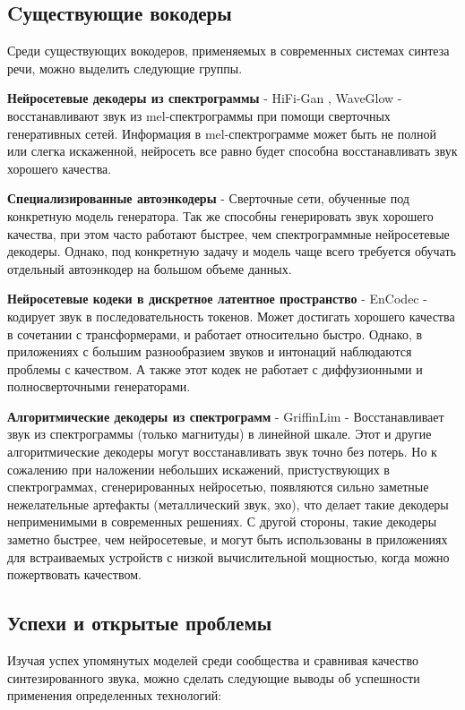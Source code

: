 \subsection{Cуществующие вокодеры}
Среди существующих вокодеров, применяемых в современных системах синтеза речи, можно выделить следующие группы.

\textbf{Нейросетевые декодеры из спектрограммы} - HiFi-Gan \cite{hifigan}, WaveGlow \cite{WaveGlow} - восстанавливают звук из mel-спектрограммы
при помощи сверточных генеративных сетей. Информация в mel-спектрограмме может быть не полной или слегка искаженной, 
нейросеть все равно будет способна восстанавливать звук хорошего качества.

\textbf{Специализированные автоэнкодеры} - Сверточные сети, обученные под конкретную модель генератора. Так же способны генерировать звук хорошего качества, 
при этом часто работают быстрее, чем спектрограммные нейросетевые декодеры. Однако, под конкретную задачу и модель чаще всего требуется обучать отдельный 
автоэнкодер на большом объеме данных.

\textbf{Нейросетевые кодеки в дискретное латентное пространство} - EnCodec \cite{encodec} - кодирует звук в последовательность токенов. 
Может достигать хорошего качества в сочетании с трансформерами, и работает относительно быстро. Однако, в приложениях с большим разнообразием звуков и интонаций 
наблюдаются проблемы с качеством. А также этот кодек не работает с диффузионными и полносверточными генераторами.

\textbf{Алгоритмические декодеры из спектрограмм} - GriffinLim \cite{1164317} - Восстанавливает звук из спектрограммы (только магнитуды) в линейной шкале. 
Этот и другие алгоритмические декодеры могут восстанавливать звук точно без потерь. Но к сожалению при наложении небольших искажений,
пристуствующих в спектрограммах, сгенерированных нейросетью, появляются сильно заметные нежелательные артефакты (металлический звук, эхо), 
что делает такие декодеры неприменимыми в современных решениях. С другой стороны, такие декодеры заметно быстрее, чем нейросетевые, 
и могут быть использованы в приложениях для встраиваемых устройств с низкой вычислительной мощностью, когда можно пожертвовать качеством.


\subsection{Успехи и открытые проблемы}
Изучая успех упомянутых моделей среди сообщества и сравнивая качество синтезированного звука, можно сделать следующие выводы об успешности применения определенных технологий:

